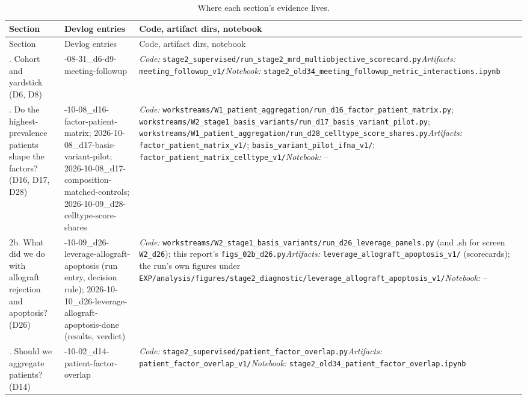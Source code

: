 {\footnotesize
\begin{longtable}{>{\raggedright\arraybackslash}p{2.6cm} >{\raggedright\arraybackslash}p{4.0cm} >{\raggedright\arraybackslash}p{8.4cm}}
\caption{Where each section's evidence lives.}\label{tab:where}\\
\toprule
Section & Devlog entries & Code, artifact dirs, notebook \\
\midrule
\endfirsthead
\toprule
Section & Devlog entries & Code, artifact dirs, notebook \\
\midrule
\endhead
\bottomrule
\endfoot
1. Cohort and yardstick (D6, D8) & 2026-08-31\_d6-d9-meeting-followup & \emph{Code:} \nolinkurl{stage2_supervised/run_stage2_mrd_multiobjective_scorecard.py}\newline \emph{Artifacts:} \nolinkurl{meeting_followup_v1/}\newline \emph{Notebook:} \nolinkurl{stage2_old34_meeting_followup_metric_interactions.ipynb} \\
\addlinespace
2. Do the highest-prevalence patients shape the factors? (D16, D17, D28) & 2026-10-08\_d16-factor-patient-matrix; 2026-10-08\_d17-basis-variant-pilot; 2026-10-08\_d17-composition-matched-controls; 2026-10-09\_d28-celltype-score-shares & \emph{Code:} \nolinkurl{workstreams/W1_patient_aggregation/run_d16_factor_patient_matrix.py}; \nolinkurl{workstreams/W2_stage1_basis_variants/run_d17_basis_variant_pilot.py}; \nolinkurl{workstreams/W1_patient_aggregation/run_d28_celltype_score_shares.py}\newline \emph{Artifacts:} \nolinkurl{factor_patient_matrix_v1/}; \nolinkurl{basis_variant_pilot_ifna_v1/}; \nolinkurl{factor_patient_matrix_celltype_v1/}\newline \emph{Notebook:} -- \\
\addlinespace
2b. What did we do with allograft rejection and apoptosis? (D26) & 2026-10-09\_d26-leverage-allograft-apoptosis (run entry, decision rule); 2026-10-10\_d26-leverage-allograft-apoptosis-done (results, verdict) & \emph{Code:} \nolinkurl{workstreams/W2_stage1_basis_variants/run_d26_leverage_panels.py} (and .sh for screen \texttt{W2\_d26}); this report's \nolinkurl{figs_02b_d26.py}\newline \emph{Artifacts:} \nolinkurl{leverage_allograft_apoptosis_v1/} (scorecards); the run's own figures under \nolinkurl{EXP/analysis/figures/stage2_diagnostic/leverage_allograft_apoptosis_v1/}\newline \emph{Notebook:} -- \\
\addlinespace
3. Should we aggregate patients? (D14) & 2026-10-02\_d14-patient-factor-overlap & \emph{Code:} \nolinkurl{stage2_supervised/patient_factor_overlap.py}\newline \emph{Artifacts:} \nolinkurl{patient_factor_overlap_v1/}\newline \emph{Notebook:} \nolinkurl{stage2_old34_patient_factor_overlap.ipynb} \\

\end{longtable}}
